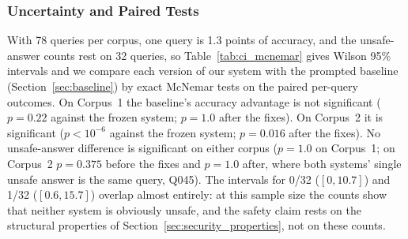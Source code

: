 \documentclass[conference]{IEEEtran}
\begin{document}
\subsubsection{Uncertainty and Paired Tests}
\label{sec:ci_mcnemar}

With 78 queries per corpus, one query is 1.3 points of accuracy, and the
unsafe-answer counts rest on 32 queries, so Table~\ref{tab:ci_mcnemar}
gives Wilson 95\% intervals and we compare each version of our system with
the prompted baseline (Section~\ref{sec:baseline}) by exact McNemar tests on
the paired per-query outcomes. On Corpus~1 the baseline's accuracy advantage
is not significant ($p=0.22$ against the frozen system; $p=1.0$ after the
fixes). On Corpus~2 it is significant ($p<10^{-6}$ against the frozen system;
$p=0.016$ after the fixes). No unsafe-answer difference is significant on
either corpus ($p=1.0$ on Corpus~1; on Corpus~2 $p=0.375$ before the fixes
and $p=1.0$ after, where both systems' single unsafe answer is the same
query, Q045). The intervals for 0/32 ($[0, 10.7]$) and 1/32
($[0.6, 15.7]$) overlap almost entirely: at this sample size the counts
show that neither system is obviously unsafe, and the safety claim rests on
the structural properties of Section~\ref{sec:security_properties}, not on
these counts.
\end{document}
